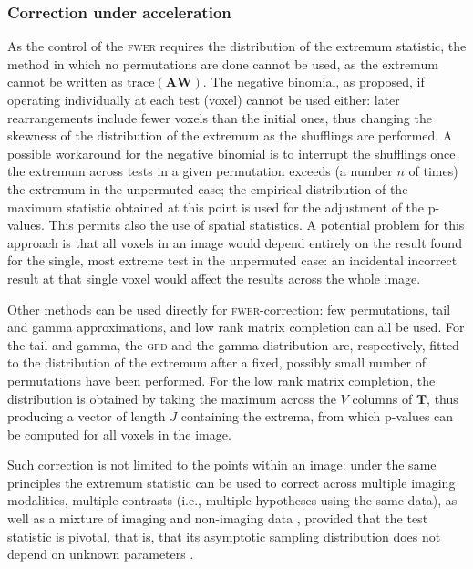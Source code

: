 \subsubsection{Correction under acceleration}

As the control of the \textsc{fwer} requires the distribution of the extremum statistic, the method in which no permutations are done cannot be used, as the extremum cannot be written as $\text{trace}(\mathbf{A}\mathbf{W})$. The negative binomial, as proposed, if operating individually at each test (voxel) cannot be used either: later rearrangements include fewer voxels than the initial ones, thus changing the skewness of the distribution of the extremum as the shufflings are performed. A possible workaround for the negative binomial is to interrupt the shufflings once the extremum across tests in a given permutation exceeds (a number $n$ of times) the extremum in the unpermuted case; the empirical distribution of the maximum statistic obtained at this point is used for the adjustment of the p-values. This permits also the use of spatial statistics. A potential problem for this approach is that all voxels in an image would depend entirely on the result found for the single, most extreme test in the unpermuted case: an incidental incorrect result at that single voxel would affect the results across the whole image.

Other methods can be used directly for \textsc{fwer}-correction: few permutations, tail and gamma approximations, and low rank matrix completion can all be used. For the tail and gamma, the \textsc{gpd} and the gamma distribution are, respectively, fitted to the distribution of the extremum after a fixed, possibly small number of permutations have been performed. For the low rank matrix completion, the distribution is obtained by taking the maximum across the $V$ columns of $\mathbf{T}$, thus producing a vector of length $J$ containing the extrema, from which p-values can be computed for all voxels in the image.

Such correction is not limited to the points within an image: under the same principles the extremum statistic can be used to correct across multiple imaging modalities, multiple contrasts (i.e., multiple hypotheses using the same data), as well as a mixture of imaging and non-imaging data \citep{Winkler2016_npc}, provided that the test statistic is pivotal, that is, that its asymptotic sampling distribution does not depend on unknown parameters \citep{Winkler2014}.

